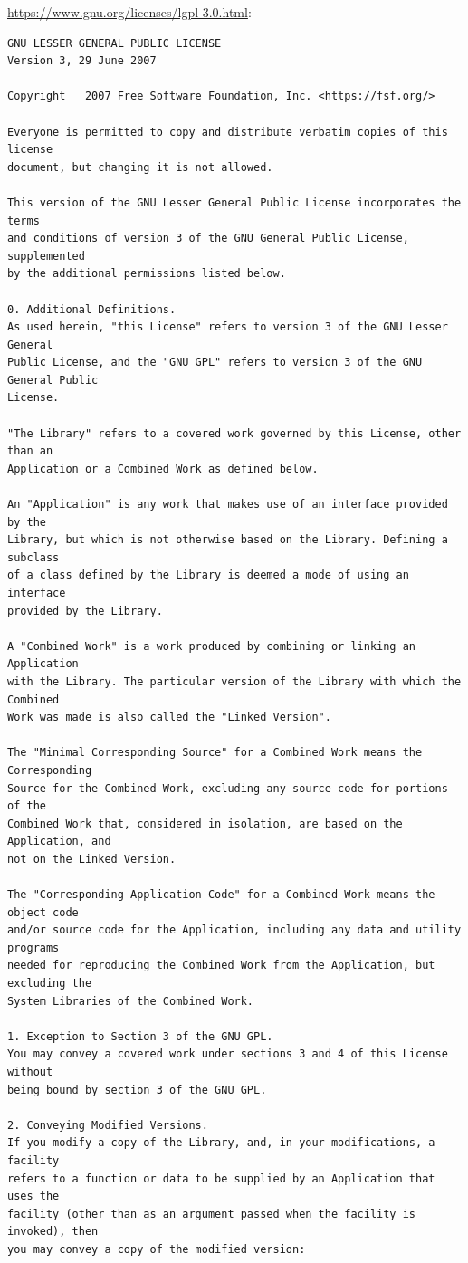 \url{https://www.gnu.org/licenses/lgpl-3.0.html}:
\scriptsize

\begin{verbatim}
GNU LESSER GENERAL PUBLIC LICENSE
Version 3, 29 June 2007

Copyright   2007 Free Software Foundation, Inc. <https://fsf.org/>

Everyone is permitted to copy and distribute verbatim copies of this license
document, but changing it is not allowed.

This version of the GNU Lesser General Public License incorporates the terms
and conditions of version 3 of the GNU General Public License, supplemented
by the additional permissions listed below.

0. Additional Definitions.
As used herein, "this License" refers to version 3 of the GNU Lesser General
Public License, and the "GNU GPL" refers to version 3 of the GNU General Public
License.

"The Library" refers to a covered work governed by this License, other than an
Application or a Combined Work as defined below.

An "Application" is any work that makes use of an interface provided by the
Library, but which is not otherwise based on the Library. Defining a subclass
of a class defined by the Library is deemed a mode of using an interface
provided by the Library.

A "Combined Work" is a work produced by combining or linking an Application
with the Library. The particular version of the Library with which the Combined
Work was made is also called the "Linked Version".

The "Minimal Corresponding Source" for a Combined Work means the Corresponding
Source for the Combined Work, excluding any source code for portions of the
Combined Work that, considered in isolation, are based on the Application, and
not on the Linked Version.

The "Corresponding Application Code" for a Combined Work means the object code
and/or source code for the Application, including any data and utility programs
needed for reproducing the Combined Work from the Application, but excluding the
System Libraries of the Combined Work.

1. Exception to Section 3 of the GNU GPL.
You may convey a covered work under sections 3 and 4 of this License without
being bound by section 3 of the GNU GPL.

2. Conveying Modified Versions.
If you modify a copy of the Library, and, in your modifications, a facility
refers to a function or data to be supplied by an Application that uses the
facility (other than as an argument passed when the facility is invoked), then
you may convey a copy of the modified version:


\end{verbatim}
